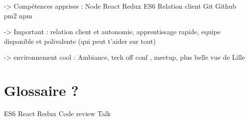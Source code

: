 -\textgreater{} Compétences apprises : Node React Redux ES6 Relation
client Git Github pm2 npm

-\textgreater{} Important : relation client et autonomie, apprentissage
rapide, equipe disponible et polivalente (qui peut t'aider sur tout)

-\textgreater{} environnement cool : Ambiance, tech off conf , meetup,
plus belle vue de Lille

\newpage

\section{Glossaire ?}\label{glossaire}

ES6 React Redux Code review Talk
